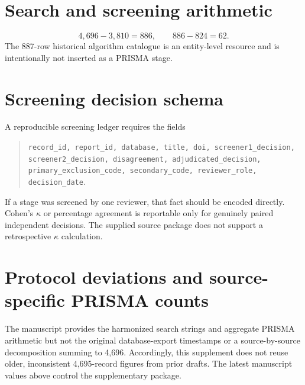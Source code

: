 \documentclass[9pt]{article}
\begin{document}
\section*{Search and screening arithmetic}
\begin{equation*}
4{,}696-3{,}810=886,\qquad 886-824=62.
\end{equation*}
The 887-row historical algorithm catalogue is an entity-level resource and is intentionally not inserted as a PRISMA stage.

\section*{Screening decision schema}
A reproducible screening ledger requires the fields
\begin{quote}\small
\texttt{record\_id, report\_id, database, title, doi, screener1\_decision, screener2\_decision, disagreement, adjudicated\_decision, primary\_exclusion\_code, secondary\_code, reviewer\_role, decision\_date}.
\end{quote}
If a stage was screened by one reviewer, that fact should be encoded directly. Cohen's $\kappa$ or percentage agreement is reportable only for genuinely paired independent decisions. The supplied source package does not support a retrospective $\kappa$ calculation.

\section*{Protocol deviations and source-specific PRISMA counts}
The manuscript provides the harmonized search strings and aggregate PRISMA arithmetic but not the original database-export timestamps or a source-by-source decomposition summing to 4,696. Accordingly, this supplement does not reuse older, inconsistent 4,695-record figures from prior drafts. The latest manuscript values above control the supplementary package.
\end{document}
